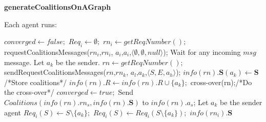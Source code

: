 \documentclass{article}
\begin{document}
\begin{algorithm}[!tb]
\caption{\textbf{generateCoalitionsOnAGraph}\label{proc:generateCoalitionOnAGraph}}
Each agent runs:
\begin{algorithmic}
\STATE $converged \leftarrow false;$
\STATE $Req_i \leftarrow \emptyset;$
\STATE $rn_i \leftarrow getReqNumber();$
\STATE requestCoalitionsMessages($rn_i$,$rn_i$,
$a_i$,$a_i$,$\langle \emptyset,\emptyset, null \rangle$);
\STATE Wait for any incoming $msg$ message. Let $a_k$ be the sender.
\STATE $rn \leftarrow getReqNumber();$
\STATE sendRequestCoalitionsMessages($rn$,$rn_k$,
$a_l$,$a_k$,$\langle S, E, a_h \rangle$);
\STATE $info(rn).\mathbf{S}(a_k)\leftarrow \mathbf{S} $/*Store
coalitions*/ 
\STATE $info(rn).R \leftarrow info(rn).R
\cup \{a_k\};$
 \STATE cross-over(rn);/*Do the cross-over*/
	\STATE $converged \leftarrow true;$
\ELSE
	\STATE Send
	$Coalitions(info(rn).rn_s,info(rn).\mathbf{S})$
	to $info(rn).a_s$;
\ENDIF
\ENDIF
\ENDIF
\ENDWHILE
{}
	\STATE Let $a_k$ be the sender agent
		\STATE $ Req_i(S) \leftarrow S \setminus \{a_k\}; $
	\ELSE
		\STATE $ Req_i(S) \leftarrow Req_i(S \setminus \{a_k\});$
	\ENDIF
\ENDFOR
\RETURN $info(rn_i).\mathbf{S}$
\end{algorithmic}
\end{algorithm}
\end{document}
